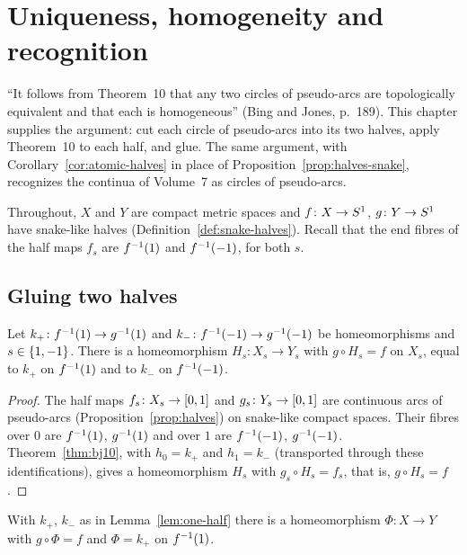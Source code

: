 \chapter{Uniqueness, homogeneity and recognition}\label{ch:uniqueness}

``It follows from Theorem~10 that any two circles of pseudo-arcs are topologically equivalent and that each is homogeneous'' (Bing and Jones, p.~189). This
chapter supplies the argument: cut each circle of pseudo-arcs into its two halves, apply Theorem~10 to each half, and glue. The same argument, with
Corollary~\ref{cor:atomic-halves} in place of Proposition~\ref{prop:halves-snake}, recognizes the continua of Volume~7 as circles of pseudo-arcs.

Throughout, $X$ and $Y$ are compact metric spaces and $f\colon X\to S^1$, $g\colon Y\to S^1$ have snake-like halves (Definition~\ref{def:snake-halves}). Recall that
the end fibres of the half maps $f_s$ are $f^{-1}(1)$ and $f^{-1}(-1)$, for both $s$.

\section{Gluing two halves}

\begin{lemma}\label{lem:one-half}
Let $k_+\colon f^{-1}(1)\to g^{-1}(1)$ and $k_-\colon f^{-1}(-1)\to g^{-1}(-1)$ be homeomorphisms and $s\in\left\{ 1,-1 \right\}$. There is a homeomorphism $H_s\colon X_s\to Y_s$ with $g\circ
H_s=f$ on $X_s$, equal to $k_+$ on $f^{-1}(1)$ and to $k_-$ on $f^{-1}(-1)$.
\end{lemma}

\begin{proof}
The half maps $f_s\colon X_s\to[0,1]$ and $g_s\colon Y_s\to[0,1]$ are continuous arcs of pseudo-arcs (Proposition~\ref{prop:halves}) on snake-like compact spaces. Their fibres over
$0$ are $f^{-1}(1)$, $g^{-1}(1)$ and over $1$ are $f^{-1}(-1)$, $g^{-1}(-1)$. Theorem~\ref{thm:bj10}, with $h_0=k_+$ and $h_1=k_-$ (transported through these identifications),
gives a homeomorphism $H_s$ with $g_s\circ H_s=f_s$, that is, $g\circ H_s=f$.
\end{proof}


\begin{theorem}[Gluing]\label{thm:glue}
With $k_+$, $k_-$ as in Lemma~\ref{lem:one-half} there is a homeomorphism $\Phi\colon X\to Y$ with $g\circ\Phi=f$ and $\Phi=k_+$ on $f^{-1}(1)$.
\end{theorem}

